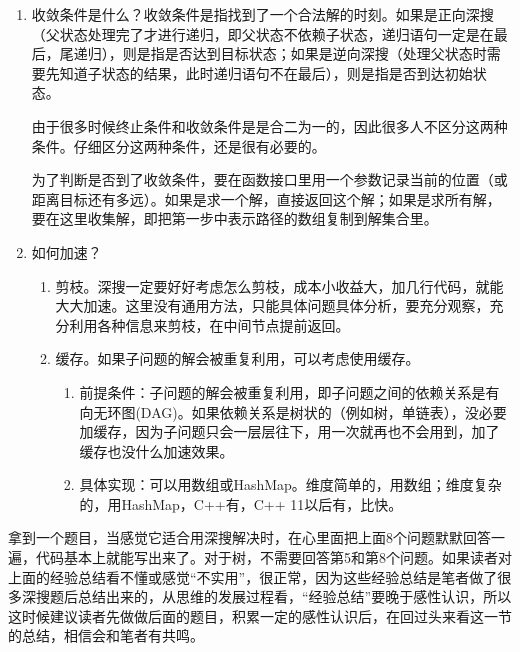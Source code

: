 \begin{enumerate}
\item {收敛条件是什么？收敛条件是指找到了一个合法解的时刻。如果是正向深搜（父状态处理完了才进行递归，即父状态不依赖子状态，递归语句一定是在最后，尾递归），则是指是否达到目标状态；如果是逆向深搜（处理父状态时需要先知道子状态的结果，此时递归语句不在最后），则是指是否到达初始状态。

由于很多时候终止条件和收敛条件是是合二为一的，因此很多人不区分这两种条件。仔细区分这两种条件，还是很有必要的。

为了判断是否到了收敛条件，要在函数接口里用一个参数记录当前的位置（或距离目标还有多远）。如果是求一个解，直接返回这个解；如果是求所有解，要在这里收集解，即把第一步中表示路径的数组复制到解集合里。}

\item 如何加速？
    \begin{enumerate}
    \item 剪枝。深搜一定要好好考虑怎么剪枝，成本小收益大，加几行代码，就能大大加速。这里没有通用方法，只能具体问题具体分析，要充分观察，充分利用各种信息来剪枝，在中间节点提前返回。
    \item 缓存。如果子问题的解会被重复利用，可以考虑使用缓存。
        \begin{enumerate}
            \item 前提条件：子问题的解会被重复利用，即子问题之间的依赖关系是有向无环图(DAG)。如果依赖关系是树状的（例如树，单链表），没必要加缓存，因为子问题只会一层层往下，用一次就再也不会用到，加了缓存也没什么加速效果。
            \item 具体实现：可以用数组或HashMap。维度简单的，用数组；维度复杂的，用HashMap，C++有，C++ 11以后有，比快。
        \end{enumerate}
    
    \end{enumerate}
\end{enumerate}

拿到一个题目，当感觉它适合用深搜解决时，在心里面把上面8个问题默默回答一遍，代码基本上就能写出来了。对于树，不需要回答第5和第8个问题。如果读者对上面的经验总结看不懂或感觉“不实用”，很正常，因为这些经验总结是笔者做了很多深搜题后总结出来的，从思维的发展过程看，“经验总结”要晚于感性认识，所以这时候建议读者先做做后面的题目，积累一定的感性认识后，在回过头来看这一节的总结，相信会和笔者有共鸣。

